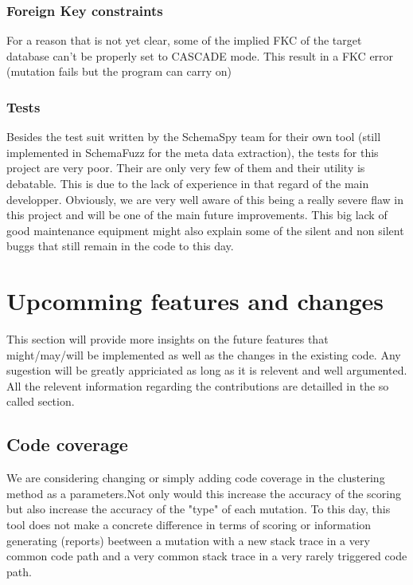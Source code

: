 \documentclass{article}
\begin{document}
			\subsubsection{Foreign Key constraints}			
For a reason that is not yet clear, some of the implied FKC of the target database can't be properly set to CASCADE mode. This result in a FKC error (mutation fails but the program can carry on)			
			\subsubsection{Tests}
Besides the test suit written by the SchemaSpy team for their own tool (still implemented in SchemaFuzz for the meta data extraction), the tests for this project are very poor. Their are only very few of them and their utility is debatable. This is due to the lack of experience in that regard of the main developper. Obviously, we are very well aware of this being a really severe flaw in this project and will be one of the main future improvements.
This big lack of good maintenance equipment might also explain some of the silent and non silent buggs that still remain in the code to this day. 			
	\section{Upcomming features and changes}
This section will provide more insights on the future features that might/may/will be implemented as well as the changes in the existing code.
Any sugestion will be greatly appriciated as long as it is relevent and well argumented. All the relevent information regarding the contributions are detailled in the so called section.
	
		\subsection{Code coverage}
We are considering changing or simply adding code coverage in the clustering method as a parameters.Not only would this increase the accuracy of the scoring but also increase the accuracy of the "type" of each mutation. To this day, this tool does not make a concrete difference in terms of scoring or information generating (reports) beetween a mutation with a new stack trace in a very common code path and a very common stack trace in a very rarely triggered code path.
\end{document}
